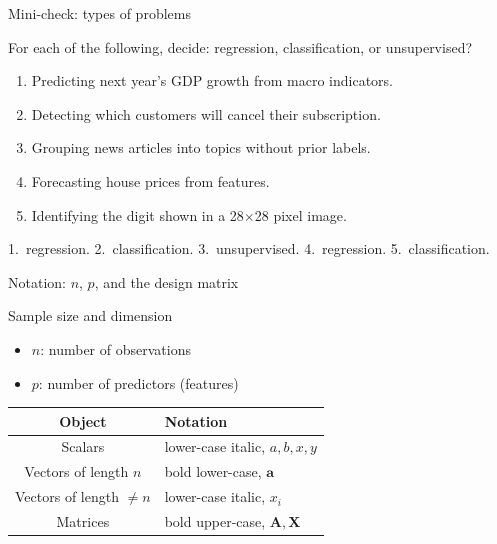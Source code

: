 \documentclass[aspectratio=169,11pt]{beamer}
\begin{document}
\begin{frame}{Mini-check: types of problems}
  \begin{readme}
    For each of the following, decide: regression, classification, or
    unsupervised?
    \begin{enumerate}
      \item Predicting next year's GDP growth from macro indicators.
      \item Detecting which customers will cancel their subscription.
      \item Grouping news articles into topics without prior labels.
      \item Forecasting house prices from features.
      \item Identifying the digit shown in a 28$\times$28 pixel image.
    \end{enumerate}
  \end{readme}
  \begin{takeaway}[Answers]
    1.\ regression. 2.\ classification. 3.\ unsupervised. 4.\ regression.
    5.\ classification.
  \end{takeaway}
\end{frame}



\begin{frame}{Notation: $n$, $p$, and the design matrix}\label{frm:notation}
  \begin{block}{Sample size and dimension}
    \begin{itemize}
      \item $n$: number of observations
      \item $p$: number of predictors (features)
    \end{itemize}
  \end{block}
  \begin{readme}
    \begin{tabular}{@{}cl@{}}
      \toprule
      \textbf{Object} & \textbf{Notation} \\
      \midrule
      Scalars & lower-case italic, $a, b, x, y$ \\
      Vectors of length $n$ & bold lower-case, $\mathbf{a}$ \\
      Vectors of length $\ne n$ & lower-case italic, $x_i$ \\
      Matrices & bold upper-case, $\mathbf{A}, \mathbf{X}$ \\
      \bottomrule
    \end{tabular}
  \end{readme}
\end{frame}
\end{document}
